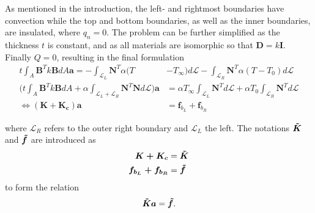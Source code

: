\documentclass[a4paper,11pt]{article}
\begin{document}
\noindent As mentioned in the introduction, the left- and rightmost boundaries have convection while the top and bottom boundaries, as well as the inner boundaries, are insulated, where $q_n = 0$. The problem can be further simplified as the thickness $t$ is constant, and as all materials are isomorphic so that $\boldsymbol D = k\boldsymbol I$. Finally $Q = 0$, resulting in the final formulation
\begin{align}
    t\int_A \boldsymbol B^T k \boldsymbol B dA \boldsymbol a = -\int_{\mathcal L_L} \boldsymbol N^T\alpha(T&-T_\infty)d\mathcal{L} -\int_{\mathcal L_R} \boldsymbol N^T\alpha(T-T_0)d\mathcal{L} \nonumber \\
    \bigg ( t\int_A \boldsymbol B^T k \boldsymbol B dA + \alpha\int_{\mathcal L_L + \mathcal L_R} \boldsymbol N^T\boldsymbol N d\mathcal{L} \bigg ) \boldsymbol a &= \alpha T_\infty\int_{\mathcal L_L} \boldsymbol N^T d\mathcal{L} + \alpha T_0\int_{\mathcal L_R} \boldsymbol N^T d\mathcal{L}\label{eq:final_stationary_temp}\\
    \iff \boldsymbol{(K+K_c)a} &= \boldsymbol f_{b_L} + \boldsymbol f_{b_R}\label{eq:long_notations}
\end{align}

\noindent where $\mathcal{L}_R$ refers to the outer right boundary and $\mathcal{L}_L$ the left. The notations $\boldsymbol{\Tilde{K}}$ and $\boldsymbol{\Tilde{f}}$ are introduced as
\begin{align}
    \boldsymbol{K+K_c} &= \boldsymbol{\Tilde{K}}\\
    \boldsymbol{f_{b_L}+f_{b_R}} &= \boldsymbol{\Tilde{f}}
\end{align}
to form the relation
\begin{equation}\label{eq:tildeKaf}
    \boldsymbol{\Tilde{K}a} = \boldsymbol{\Tilde{f}}.
\end{equation}
\end{document}
